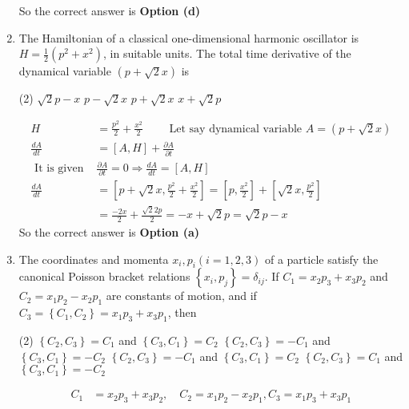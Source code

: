 \begin{enumerate}
\begin{answer}
$$$$
So the correct answer is \textbf{Option (d)}
\end{answer}
\item The Hamiltonian of a classical one-dimensional harmonic oscillator is $H=\frac{1}{2}\left(p^{2}+x^{2}\right)$, in suitable units. The total time derivative of the dynamical variable $(p+\sqrt{2} x)$ is
{}
 \begin{tasks}(2)
	\task[\textbf{a.}]$\sqrt{2} p-x$
	\task[\textbf{b.}]$p-\sqrt{2} x$
	\task[\textbf{c.}] $p+\sqrt{2} x$
	\task[\textbf{d.}] $x+\sqrt{2} p$
\end{tasks}
\begin{answer}
	$$
	\begin{aligned}
	H&=\frac{p^{2}}{2}+\frac{x^{2}}{2}\qquad \text { Let say dynamical variable } A=(p+\sqrt{2} x)\\
	\frac{d A}{d t}&=[A, H]+\frac{\partial A}{\partial t}\\
	\text { It is given } &\frac{\partial A}{\partial t}=0 \Rightarrow \frac{d A}{d t}=[A, H]\\
	\frac{d A}{d t}&=\left[p+\sqrt{2} x, \frac{p^{2}}{2}+\frac{x^{2}}{2}\right]=\left[p, \frac{x^{2}}{2}\right]+\left[\sqrt{2} x, \frac{p^{2}}{2}\right]\\&=\frac{-2 x}{2}+\frac{\sqrt{2} 2 p}{2}=-x+\sqrt{2} p=\sqrt{2} p-x
\end{aligned}
$$
So the correct answer is \textbf{Option (a)}
\end{answer}
\item The coordinates and momenta $x_{i}, p_{i}(i=1,2,3)$ of a particle satisfy the canonical Poisson bracket relations $\left\{x_{i}, p_{j}\right\}=\delta_{i j}$. If $C_{1}=x_{2} p_{3}+x_{3} p_{2}$ and $C_{2}=x_{1} p_{2}-x_{2} p_{1}$ are constants of motion, and if $C_{3}=\left\{C_{1}, C_{2}\right\}=x_{1} p_{3}+x_{3} p_{1}$, then
{}
 \begin{tasks}(2)
	\task[\textbf{a.}]$\left\{C_{2}, C_{3}\right\}=C_{1}$ and $\left\{C_{3}, C_{1}\right\}=C_{2}$
	\task[\textbf{b.}] $\left\{C_{2}, C_{3}\right\}=-C_{1}$ and $\left\{C_{3}, C_{1}\right\}=-C_{2}$
	\task[\textbf{c.}] $\left\{C_{2}, C_{3}\right\}=-C_{1}$ and $\left\{C_{3}, C_{1}\right\}=C_{2}$
	\task[\textbf{d.}] $\left\{C_{2}, C_{3}\right\}=C_{1}$ and $\left\{C_{3}, C_{1}\right\}=-C_{2}$
\end{tasks}
\begin{answer}
	$$
	\begin{aligned}
	C_{1}&=x_{2} p_{3}+x_{3} p_{2}, \quad C_{2}=x_{1} p_{2}-x_{2} p_{1}, C_{3}=x_{1} p_{3}+x_{3} p_{1}\\

\end{aligned}$$
\end{answer}
\end{enumerate}
